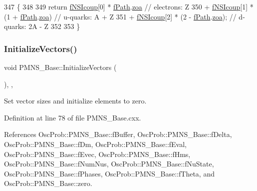 \begin{DoxyCode}
347 \{
348 
349   \textcolor{keywordflow}{return} \hyperlink{classOscProb_1_1PMNS__NSI_a1ac51957bbc4cec9fcfd8f816491cc95}{fNSIcoup}[0] * \hyperlink{classOscProb_1_1PMNS__Base_a849437aa8891fe042e86886ce8f81c6e}{fPath}.\hyperlink{structOscProb_1_1NuPath_af3213f3691ba83c6bc05f4a3490f6b31}{zoa}        \textcolor{comment}{// electrons: Z}
350        + \hyperlink{classOscProb_1_1PMNS__NSI_a1ac51957bbc4cec9fcfd8f816491cc95}{fNSIcoup}[1] * (1 + \hyperlink{classOscProb_1_1PMNS__Base_a849437aa8891fe042e86886ce8f81c6e}{fPath}.\hyperlink{structOscProb_1_1NuPath_af3213f3691ba83c6bc05f4a3490f6b31}{zoa})  \textcolor{comment}{// u-quarks:  A + Z}
351        + \hyperlink{classOscProb_1_1PMNS__NSI_a1ac51957bbc4cec9fcfd8f816491cc95}{fNSIcoup}[2] * (2 - \hyperlink{classOscProb_1_1PMNS__Base_a849437aa8891fe042e86886ce8f81c6e}{fPath}.\hyperlink{structOscProb_1_1NuPath_af3213f3691ba83c6bc05f4a3490f6b31}{zoa}); \textcolor{comment}{// d-quarks: 2A - Z }
352 
353 \}
\end{DoxyCode}
\mbox{\label{classOscProb_1_1PMNS__Base_adf23b569112f9f9e0e592f01d79a5f3d}} 
\subsubsection{\texorpdfstring{Initialize\+Vectors()}{InitializeVectors()}}
{\footnotesize\ttfamily void P\+M\+N\+S\+\_\+\+Base\+::\+Initialize\+Vectors (\begin{DoxyParamCaption}{ }\end{DoxyParamCaption})\hspace{0.3cm}{\ttfamily [protected]}, {\ttfamily [virtual]}, {\ttfamily [inherited]}}

Set vector sizes and initialize elements to zero. 

Definition at line 78 of file P\+M\+N\+S\+\_\+\+Base.\+cxx.



References Osc\+Prob\+::\+P\+M\+N\+S\+\_\+\+Base\+::f\+Buffer, Osc\+Prob\+::\+P\+M\+N\+S\+\_\+\+Base\+::f\+Delta, Osc\+Prob\+::\+P\+M\+N\+S\+\_\+\+Base\+::f\+Dm, Osc\+Prob\+::\+P\+M\+N\+S\+\_\+\+Base\+::f\+Eval, Osc\+Prob\+::\+P\+M\+N\+S\+\_\+\+Base\+::f\+Evec, Osc\+Prob\+::\+P\+M\+N\+S\+\_\+\+Base\+::f\+Hms, Osc\+Prob\+::\+P\+M\+N\+S\+\_\+\+Base\+::f\+Num\+Nus, Osc\+Prob\+::\+P\+M\+N\+S\+\_\+\+Base\+::f\+Nu\+State, Osc\+Prob\+::\+P\+M\+N\+S\+\_\+\+Base\+::f\+Phases, Osc\+Prob\+::\+P\+M\+N\+S\+\_\+\+Base\+::f\+Theta, and Osc\+Prob\+::\+P\+M\+N\+S\+\_\+\+Base\+::zero.



